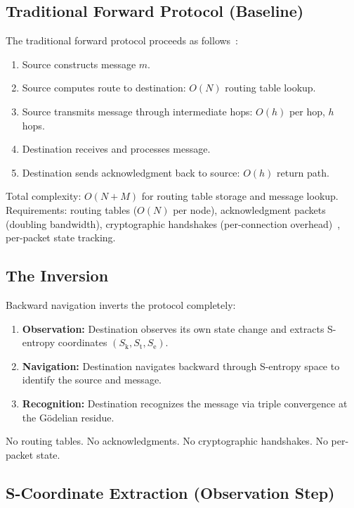 \documentclass[11pt,twocolumn,a4paper]{article}
\theoremstyle{definition}
\newcommand{\Sk}{S_{\mathrm{k}}}
\newcommand{\St}{S_{\mathrm{t}}}
\newcommand{\Se}{S_{\mathrm{e}}}
\begin{document}
\subsection{Traditional Forward Protocol (Baseline)}\label{sec:backward:forward}

The traditional forward protocol proceeds as follows~\cite{lamport1978}:

\begin{enumerate}
  \item Source constructs message $m$.
  \item Source computes route to destination: $O(N)$ routing table lookup.
  \item Source transmits message through intermediate hops: $O(h)$ per hop, $h$ hops.
  \item Destination receives and processes message.
  \item Destination sends acknowledgment back to source: $O(h)$ return path.
\end{enumerate}

Total complexity: $O(N + M)$ for routing table storage and message lookup. Requirements:
routing tables ($O(N)$ per node), acknowledgment packets (doubling bandwidth),
cryptographic handshakes (per-connection overhead)~\cite{rivest1978,diffie1976},
per-packet state tracking.

\subsection{The Inversion}\label{sec:backward:inversion}

Backward navigation inverts the protocol completely:

\begin{enumerate}
  \item \textbf{Observation:} Destination observes its own state change and extracts
        S-entropy coordinates $(\Sk, \St, \Se)$.
  \item \textbf{Navigation:} Destination navigates backward through S-entropy space to
        identify the source and message.
  \item \textbf{Recognition:} Destination recognizes the message via triple convergence
        at the G\"odelian residue.
\end{enumerate}

No routing tables. No acknowledgments. No cryptographic handshakes. No per-packet state.

\subsection{S-Coordinate Extraction (Observation Step)}\label{sec:backward:extraction}
\end{document}
